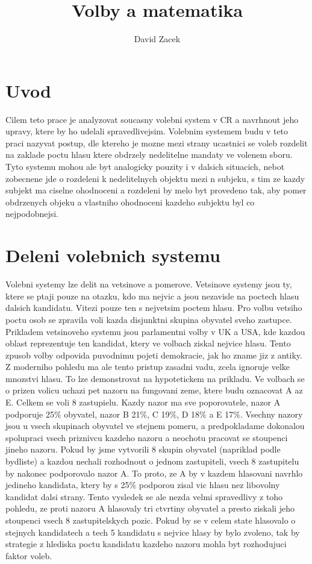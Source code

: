 \documentclass[12pt,a4paper]{article}
\author{David Zacek}
\title{Volby a matematika}
\begin{document}
\section{Uvod}
Cilem teto prace je analyzovat soucasny volebni system v CR a navrhnout jeho upravy, ktere by ho udelali spravedlivejsim. 
Volebnim systemem budu v teto praci nazyvat postup, dle ktereho je mozne mezi strany ucastnici se voleb rozdelit na zaklade poctu hlasu ktere obdrzely nedelitelne mandaty ve volenem sboru.
Tyto systemu mohou ale byt analogicky pouzity i v dalsich situacich, nebot zobecnene jde o rozdeleni k nedelitelnych objektu mezi n subjeku, s tim ze kazdy subjekt ma ciselne ohodnoceni a rozdeleni by melo byt provedeno tak, aby pomer obdrzenych objeku a vlastniho ohodnoceni kazdeho subjektu byl co nejpodobnejsi. 

\section{Deleni volebnich systemu}
Volebni systemy lze delit na vetsinove a pomerove. Vetsinove systemy jsou ty, ktere se ptaji pouze na otazku, kdo ma nejvic a jsou nezavisle na poctech hlasu dalsich kandidatu.
Vitezi pouze ten s nejvetsim poctem hlasu. Pro volbu vetsiho poctu osob se zpravila voli kazda disjunktni skupina obyvatel sveho zastupce. Prikladem vetsinoveho systemu jsou parlamentni volby v UK a USA, kde kazdou oblast reprezentuje ten kandidat, ktery ve volbach ziskal nejvice hlasu. Tento zpusob volby odpovida puvodnimu pojeti demokracie, jak ho zname jiz z antiky. 
Z moderniho pohledu ma ale tento pristup zasadni vadu, zcela ignoruje velke mnozstvi hlasu.
To lze demonstrovat na hypotetickem na prikladu. Ve volbach se o prizen volicu uchazi pet nazoru na fungovani zeme, ktere budu oznacovat A az E.
Celkem se voli 8 zastupielu.
Kazdy nazor ma sve poporovatele, nazor A podporuje 25\% obyvatel, nazor B 21\%, C 19\%, D 18\% a E 17\%.
Vsechny nazory jsou u vsech skupinach obyvatel ve stejnem pomeru, a predpokladame dokonalou spolupraci vsech priznivcu kazdeho nazoru a neochotu pracovat se stoupenci jineho nazoru.
Pokud by jsme vytvorili 8 skupin obyvatel (napriklad podle bydliste) a kazdou nechali rozhodnout o jednom zastupiteli, vsech 8 zastupitelu by nakonec podporovalo nazor A.
To proto, ze A by v kazdem hlasovani navrhlo jedineho kandidata, ktery by s 25\% podporou zisal vic hlasu nez libovolny kandidat dalsi strany. 
Tento vysledek se ale nezda velmi spravedlivy z toho pohledu, ze proti nazoru A hlasovaly tri ctvrtiny obyvatel a presto ziskali jeho stoupenci vsech 8 zastupitelskych pozic.
Pokud by se v celem state hlasovalo o stejnych kandidatech a tech 5 kandidatu s nejvice hlasy by bylo zvoleno, tak by strategie z hlediska poctu kandidatu kazdeho nazoru mohla byt rozhodujuci faktor voleb. 
\end{document}
